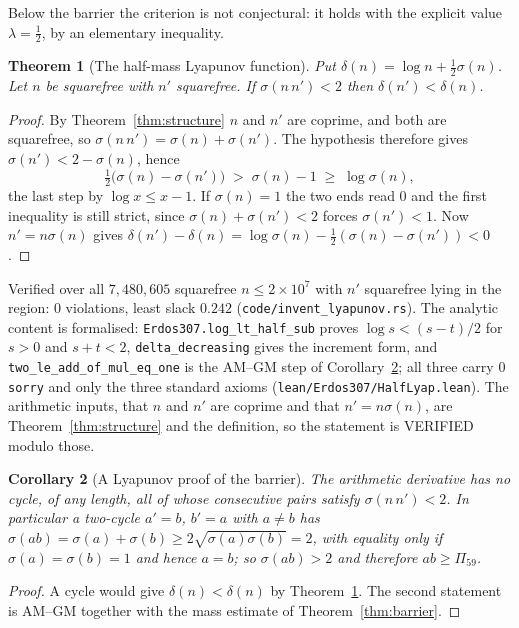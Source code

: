 \documentclass[11pt]{article}
\newtheorem{theorem}{Theorem}[section]
\newtheorem{corollary}[theorem]{Corollary}
\theoremstyle{definition}
\begin{document}
Below the barrier the criterion is not conjectural: it holds with the explicit value
$\lambda=\tfrac12$, by an elementary inequality.

\begin{theorem}[The half-mass Lyapunov function]\label{thm:halflyap}
Put $\delta(n)=\log n+\tfrac12\sigma(n)$. Let $n$ be squarefree with $n'$ squarefree. If
$\sigma(n\,n')<2$ then $\delta(n')<\delta(n)$.
\end{theorem}
\begin{proof}
By Theorem~\ref{thm:structure} $n$ and $n'$ are coprime, and both are squarefree, so
$\sigma(n\,n')=\sigma(n)+\sigma(n')$. The hypothesis therefore gives $\sigma(n')<2-\sigma(n)$, hence
\[ \tfrac12\bigl(\sigma(n)-\sigma(n')\bigr)\;>\;\sigma(n)-1\;\ge\;\log\sigma(n), \]
the last step by $\log x\le x-1$. If $\sigma(n)=1$ the two ends read $0$ and the first inequality is
still strict, since $\sigma(n)+\sigma(n')<2$ forces $\sigma(n')<1$. Now $n'=n\sigma(n)$ gives
$\delta(n')-\delta(n)=\log\sigma(n)-\tfrac12(\sigma(n)-\sigma(n'))<0$.
\end{proof}
Verified over all $7{,}480{,}605$ squarefree $n\le2\times10^7$ with $n'$ squarefree lying in the
region: $0$ violations, least slack $0.242$ \textup{(\texttt{code/invent\_lyapunov.rs})}. The analytic content is formalised:
\texttt{Erdos307.log\_lt\_half\_sub} proves $\log s<(s-t)/2$ for $s>0$ and $s+t<2$,
\texttt{delta\_decreasing} gives the increment form, and
\texttt{two\_le\_add\_of\_mul\_eq\_one} is the \textup{AM--GM} step of
Corollary~\ref{cor:lyapbarrier}; all three carry $0$ \texttt{sorry} and only the three standard
axioms \textup{(\texttt{lean/Erdos307/HalfLyap.lean})}. The arithmetic inputs, that $n$ and $n'$ are
coprime and that $n'=n\sigma(n)$, are Theorem~\ref{thm:structure} and the definition, so the
statement is \textup{VERIFIED} modulo those.

\begin{corollary}[A Lyapunov proof of the barrier]\label{cor:lyapbarrier}
The arithmetic derivative has no cycle, of any length, all of whose consecutive pairs satisfy
$\sigma(n\,n')<2$. In particular a two-cycle $a'=b$, $b'=a$ with $a\neq b$ has
$\sigma(ab)=\sigma(a)+\sigma(b)\ge2\sqrt{\sigma(a)\sigma(b)}=2$, with equality only if
$\sigma(a)=\sigma(b)=1$ and hence $a=b$; so $\sigma(ab)>2$ and therefore $ab\ge\Pi_{59}$.
\end{corollary}
\begin{proof}
A cycle would give $\delta(n)<\delta(n)$ by Theorem~\ref{thm:halflyap}. The second statement is
AM--GM together with the mass estimate of Theorem~\ref{thm:barrier}.
\end{proof}
\end{document}
